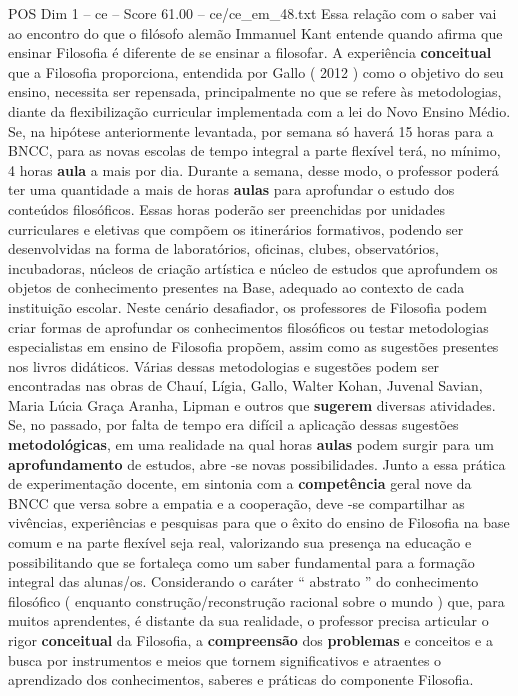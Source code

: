 \begin{textsample}{POS Dim 1 – ce – Score 61.00 – ce/ce\_em\_48.txt}
Essa relação com o saber vai ao encontro do que o filósofo alemão Immanuel Kant entende quando afirma que ensinar Filosofia é diferente de se ensinar a filosofar.
A experiência \textbf{conceitual} que a Filosofia proporciona, entendida por Gallo ( 2012 ) como o objetivo do seu ensino, necessita ser repensada, principalmente no que se refere às metodologias, diante da flexibilização curricular implementada com a lei do Novo Ensino Médio.
Se, na hipótese anteriormente levantada, por semana só haverá 15 horas para a BNCC, para as novas escolas de tempo integral a parte flexível terá, no mínimo, 4 horas \textbf{aula} a mais por dia.
Durante a semana, desse modo, o professor poderá ter uma quantidade a mais de horas \textbf{aulas} para aprofundar o estudo dos conteúdos filosóficos.
Essas horas poderão ser preenchidas por unidades curriculares e eletivas que compõem os itinerários formativos, podendo ser desenvolvidas na forma de laboratórios, oficinas, clubes, observatórios, incubadoras, núcleos de criação artística e núcleo de estudos que aprofundem os objetos de conhecimento presentes na Base, adequado ao contexto de cada instituição escolar.
Neste cenário desafiador, os professores de Filosofia podem criar formas de aprofundar os conhecimentos filosóficos ou testar metodologias especialistas em ensino de Filosofia propõem, assim como as sugestões presentes nos livros didáticos.
Várias dessas metodologias e sugestões podem ser encontradas nas obras de Chauí, Lígia, Gallo, Walter Kohan, Juvenal Savian, Maria Lúcia Graça Aranha, Lipman e outros que \textbf{sugerem} diversas atividades.
Se, no passado, por falta de tempo era difícil a aplicação dessas sugestões \textbf{metodológicas}, em uma realidade na qual horas \textbf{aulas} podem surgir para um \textbf{aprofundamento} de estudos, abre -se novas possibilidades.
Junto a essa prática de experimentação docente, em sintonia com a \textbf{competência} geral nove da BNCC que versa sobre a empatia e a cooperação, deve -se compartilhar as vivências, experiências e pesquisas para que o êxito do ensino de Filosofia na base comum e na parte flexível seja real, valorizando sua presença na educação e possibilitando que se fortaleça como um saber fundamental para a formação integral das alunas/os.
Considerando o caráter “ abstrato ” do conhecimento filosófico ( enquanto construção/reconstrução racional sobre o mundo ) que, para muitos aprendentes, é distante da sua realidade, o professor precisa articular o rigor \textbf{conceitual} da Filosofia, a \textbf{compreensão} dos \textbf{problemas} e conceitos e a busca por instrumentos e meios que tornem significativos e atraentes o aprendizado dos conhecimentos, saberes e práticas do componente Filosofia.

\end{textsample}
